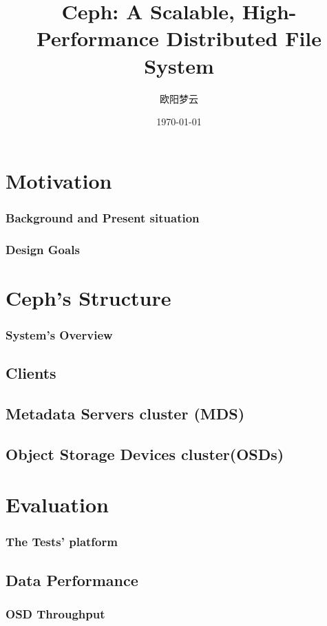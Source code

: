 \documentclass[cjk,slidestop,mathserif]{beamer}
\begin{document}
\begin{CJK}{UTF8}{gkai}
\title{Ceph: A Scalable, High-Performance Distributed File System}
\author{欧阳梦云}
\date{\today}
\frame{\titlepage}%
 
\section{Motivation}
\begin{frame}
 \frametitle{Background and Present situation}
\end{frame}

\begin{frame}
 \frametitle{Design Goals}
 
\end{frame}

\section{Ceph's Structure}
\begin{frame}
 \frametitle{System's Overview}
 
\end{frame}

\subsection{Clients}

\subsection{Metadata Servers cluster (MDS)}
\subsection{Object Storage Devices cluster(OSDs)}

\section{Evaluation}
\begin{frame}
 \frametitle{The Tests' platform}
 
\end{frame}

\subsection{Data Performance}
\begin{frame}
 \frametitle{OSD Throughput}
 

\end{frame}
\end{CJK}
\end{document}
